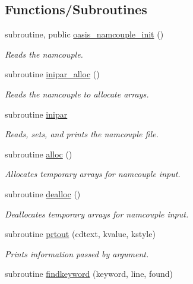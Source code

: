 \subsection*{Functions/\+Subroutines}
\begin{DoxyCompactItemize}
\item 
subroutine, public \hyperlink{namespacemod__oasis__namcouple_ab57c69ae534734f92a85e24a3389e972}{oasis\+\_\+namcouple\+\_\+init} ()
\begin{DoxyCompactList}\small\item\em Reads the namcouple. \end{DoxyCompactList}\item 
subroutine \hyperlink{namespacemod__oasis__namcouple_acb43892c17b5f8c8b360effb5a811c27}{inipar\+\_\+alloc} ()
\begin{DoxyCompactList}\small\item\em Reads the namcouple to allocate arrays. \end{DoxyCompactList}\item 
subroutine \hyperlink{namespacemod__oasis__namcouple_a6da9d2285766ceb22ea8449f55201d84}{inipar}
\begin{DoxyCompactList}\small\item\em Reads, sets, and prints the namcouple file. \end{DoxyCompactList}\item 
subroutine \hyperlink{namespacemod__oasis__namcouple_a0d85a5dcb3fab17a680cceed332b9668}{alloc} ()
\begin{DoxyCompactList}\small\item\em Allocates temporary arrays for namcouple input. \end{DoxyCompactList}\item 
subroutine \hyperlink{namespacemod__oasis__namcouple_abf09a0e902f44f77874a75bb4a7fba33}{dealloc} ()
\begin{DoxyCompactList}\small\item\em Deallocates temporary arrays for namcouple input. \end{DoxyCompactList}\item 
subroutine \hyperlink{namespacemod__oasis__namcouple_aee06276b65463fb85340dcc2ab9d67dc}{prtout} (cdtext, kvalue, kstyle)
\begin{DoxyCompactList}\small\item\em Prints information passed by argument. \end{DoxyCompactList}\item 
subroutine \hyperlink{namespacemod__oasis__namcouple_a5f87ffd480c100a94dcdf02f69b23080}{findkeyword} (keyword, line, found)

\end{DoxyCompactItemize}
